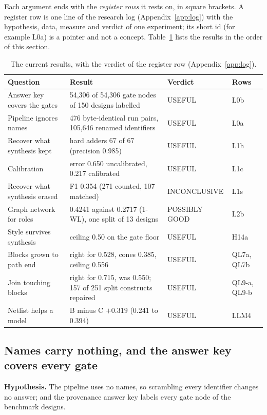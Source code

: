 \documentclass[conference]{IEEEtran}
\newcommand{\hev}[1]{\par\smallskip\noindent\textbf{#1}}
\begin{document}
Each argument ends with the \emph{register rows} it rests on, in square brackets. A register row is one line of the research log (Appendix~\ref{app:log}) with the hypothesis, data, measure and verdict of one experiment; its short id (for example L0a) is a pointer and not a concept. Table~\ref{tab:headline} lists the results in the order of this section.

\begin{table}[t]
\caption{The current results, with the verdict of the register row (Appendix~\ref{app:log}).}
\label{tab:headline}
\centering
\footnotesize
\begin{tabular}{@{}p{}p{}p{}p{}@{}}
\toprule
Question & Result & Verdict & Rows \\
\midrule
Answer key covers the gates & 54,306 of 54,306 gate nodes of 150 designs labelled & USEFUL & L0b \\
Pipeline ignores names & 476 byte-identical run pairs, 105,646 renamed identifiers & USEFUL & L0a \\
Recover what synthesis kept & hard adders 67 of 67 (precision 0.985) & USEFUL & L1h \\
Calibration & error 0.650 uncalibrated, 0.217 calibrated & USEFUL & L1c \\
Recover what synthesis erased & F1 0.354 (271 counted, 107 matched) & INCONCLUSIVE & L1s \\
Graph network for roles & 0.4241 against 0.2717 (1-WL), one split of 13 designs & POSSIBLY GOOD & L2b \\
Style survives synthesis & ceiling 0.50 on the gate floor & USEFUL & H14a \\
Blocks grown to path end & right for 0.528, cones 0.385, ceiling 0.556 & USEFUL & QL7a, QL7b \\
Join touching blocks & right for 0.715, was 0.550; 157 of 251 split constructs repaired & USEFUL & QL9-a, QL9-b \\
Netlist helps a model & B minus C $+0.319$ (0.241 to 0.394) & USEFUL & LLM4 \\
\bottomrule
\end{tabular}
\end{table}

\subsection{Names carry nothing, and the answer key covers every gate}
\label{arg:ra1}

\hev{Hypothesis.} The pipeline uses no names, so scrambling every identifier changes no answer; and the provenance answer key labels every gate node of the benchmark designs.
\end{document}
